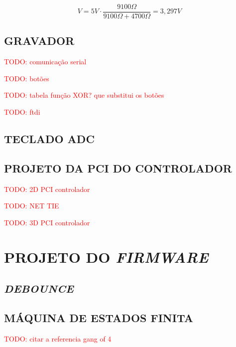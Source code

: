 \begin{equation}
    V = 5V \cdot \frac{9100\Omega}{9100\Omega+4700\Omega} = 3,297V
    \label{eq:5v-3v3}
\end{equation}

\subsection{GRAVADOR}
\label{subsec:gravador}

\textcolor{red}{TODO: comunicação serial}

\textcolor{red}{TODO: botões}

\textcolor{red}{TODO: tabela função XOR? que substitui os botões}

\textcolor{red}{TODO: ftdi}

\subsection{TECLADO ADC}
\label{subsec:tecladoadc}

\subsection{PROJETO DA PCI DO CONTROLADOR}
\label{subsec:pcicontrol}

\textcolor{red}{TODO: 2D PCI controlador}

\textcolor{red}{TODO: NET TIE}

\textcolor{red}{TODO: 3D PCI controlador}

\section{PROJETO DO \emph{FIRMWARE}}
\label{sec:firmware}

\subsection{\emph{DEBOUNCE}}
\label{subsec:debounce}

\subsection{MÁQUINA DE ESTADOS FINITA}
\label{subsec:fsm}

\textcolor{red}{TODO: citar a referencia gang  of 4}

